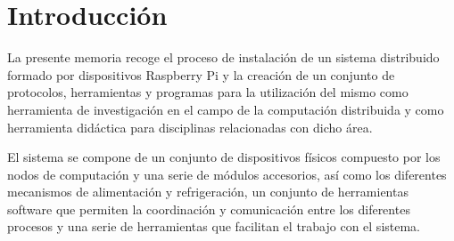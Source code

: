 \chapter{Introducción}

La presente memoria recoge el proceso de instalación de un sistema distribuido formado por dispositivos Raspberry Pi y la creación de un conjunto de protocolos, herramientas y programas para la utilización del mismo como herramienta de investigación en el campo de la computación distribuida y como herramienta didáctica para disciplinas relacionadas con dicho área.

El sistema se compone de un conjunto de dispositivos físicos compuesto por los nodos de computación y una serie de módulos accesorios, así como los diferentes mecanismos de alimentación y refrigeración, un conjunto de herramientas software que permiten la coordinación y comunicación entre los diferentes procesos y una serie de herramientas que facilitan el trabajo con el sistema.